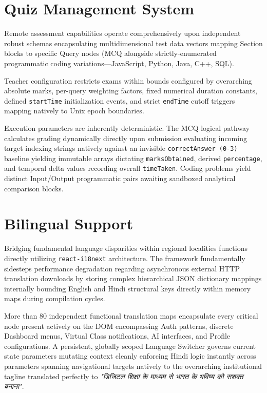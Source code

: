 \documentclass[12pt, journal, onecolumn]{IEEEtran}
\begin{document}
\section{Quiz Management System}
Remote assessment capabilities operate comprehensively upon independent robust schemas encapsulating multidimensional test data vectors mapping Section blocks to specific Query nodes (MCQ alongside strictly-enumerated programmatic coding variations—JavaScript, Python, Java, C++, SQL).

Teacher configuration restricts exams within bounds configured by overarching absolute marks, per-query weighting factors, fixed numerical duration constants, defined \texttt{startTime} initialization events, and strict \texttt{endTime} cutoff triggers mapping natively to Unix epoch boundaries.

Execution parameters are inherently deterministic. The MCQ logical pathway calculates grading dynamically directly upon submission evaluating incoming target indexing strings natively against an invisible \texttt{correctAnswer (0-3)} baseline yielding immutable arrays dictating \texttt{marksObtained}, derived \texttt{percentage}, and temporal delta values recording overall \texttt{timeTaken}. Coding problems yield distinct Input/Output programmatic pairs awaiting sandboxed analytical comparison blocks.

\section{Bilingual Support}
Bridging fundamental language disparities within regional localities functions directly utilizing \texttt{react-i18next} architecture. The framework fundamentally sidesteps performance degradation regarding asynchronous external HTTP translation downloads by storing complex hierarchical JSON dictionary mappings internally bounding English and Hindi structural keys directly within memory maps during compilation cycles.

More than 80 independent functional translation maps encapsulate every critical node present actively on the DOM encompassing Auth patterns, discrete Dashboard menus, Virtual Class notifications, AI interfaces, and Profile configurations. A persistent, globally scoped Language Switcher governs current state parameters mutating context cleanly enforcing Hindi logic instantly across parameters spanning navigational targets natively to the overarching institutional tagline translated perfectly to \textit{"डिजिटल शिक्षा के माध्यम से भारत के भविष्य को सशक्त बनाना"}.
\end{document}
